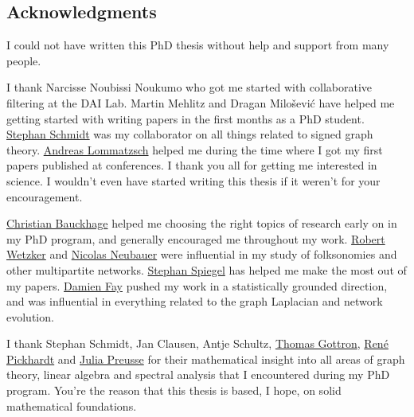 \documentclass[11pt,a4paper]{book}
\begin{document}
\begin{spacing}{1.3}

\clearpage
\section*{Acknowledgments}
I could not have written this PhD thesis without help and support from
many people.  

I thank Narcisse Noubissi Noukumo who got me started with
collaborative 
filtering at the DAI Lab. 
Martin Mehlitz and Dragan Milošević have
helped me getting started with 
writing papers in the first months as a PhD student.
\href{http://www.dai-labor.de/team/stephan.schmidt}{Stephan Schmidt} was
my collaborator on all things 
related to signed graph theory.
\href{http://www.dai-labor.de/team/andreas.lommatzsch}{Andreas
  Lommatzsch} helped me during the 
time where I got my first papers published at conferences.
I thank you all for getting me interested in science.  I wouldn't even
have started writing this thesis if it weren't for your encouragement. 

\href{http://mmprec.iais.fraunhofer.de/bauckhage}{Christian Bauckhage}
helped me choosing the right topics of research early on in my PhD
program, and generally encouraged me throughout my work.
\href{http://robertwetzker.com/}{Robert Wetzker} and \href{http://www.nicolasneubauer.net/}{Nicolas Neubauer} were
influential in my study of 
folksonomies and other multipartite networks. 
\href{http://www.dai-labor.de/de/kompetenzzentren/ngs/mitarbeiter/stephan.spiegel}{Stephan 
  Spiegel} has helped me make the most out of my papers. 
\href{http://www.cl.cam.ac.uk/~df276/}{Damien Fay} pushed my work in a
statistically grounded direction, and was 
influential in everything related to the graph Laplacian and network
evolution. 

I thank Stephan Schmidt, Jan Clausen, Antje Schultz,
\href{http://www.uni-koblenz-landau.de/koblenz/fb4/AGStaab/Persons/Gottron}{Thomas
  Gottron}, \href{http://www.rene-pickhardt.de/}{René Pickhardt} and
\href{http://www.uni-koblenz-landau.de/koblenz/fb4/AGStaab/Persons/julia-preusse}{Julia
  Preusse} for their mathematical insight into all areas of graph
theory, linear algebra and spectral analysis that I encountered during
my PhD program.  You're the reason that this thesis is based, I hope, on
solid mathematical foundations.


\end{spacing}
\end{document}

